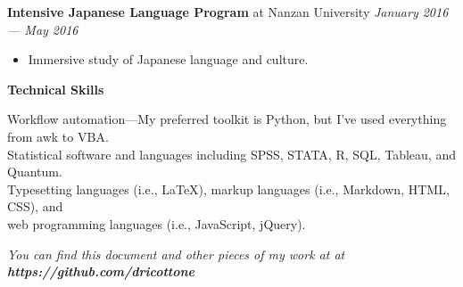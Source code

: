 \documentclass[12pt]{article}
\newenvironment{details}{
\begin{itemize}[label={}]
	\small \setlength{\itemsep}{0pt}
}{\end{itemize}}
\begin{document}
\normalsize
\textbf{Intensive Japanese Language Program} at Nanzan University \hfill \textit{January 2016 --- May 2016}
\begin{details}
	\item Immersive study of Japanese language and culture. \\
\end{details}

\vspace{.2in}
\large
\textbf{Technical Skills} \hrulefill

\normalsize
\onehalfspacing
\begin{flushleft}
	Workflow automation---My preferred toolkit is Python, but I've used everything from awk to VBA. \\
	Statistical software and languages including SPSS, STATA, R, SQL, Tableau, and Quantum. \\
	Typesetting languages (i.e., \LaTeX), markup languages (i.e., Markdown, HTML, CSS), and \\
	\hspace{.1in} web programming languages (i.e., JavaScript, jQuery). \\
\end{flushleft}

\footnotesize
\textit{You can find this document and other pieces of my work at at \textbf{https://github.com/dricottone}}
\end{document}
